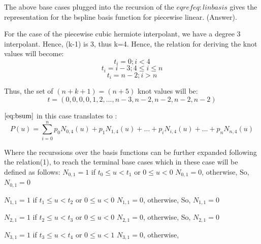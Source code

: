 \documentclass{article}
\begin{document}
The above base cases plugged into the recursion of the $eqref{eq:linbasis}$ gives the representation for the bspline basis function for piecewise linear. (Answer). \newline

For the case of the piecewise cubic hermiote interpolant, we have a degree 3 interpolant. Hence, (k-1) is 3, thus k=4. Hence, the relation for deriving the knot values will become: \newline
\[ t_i = 0; i < 4\]
\[ t_i = i-3; 4 \leq i \leq n \]
\[ t_i = n-2; i > n\]

Thus, the set of $(n+k+1) = (n+5)$ knot values will be: \newline
\[ t = (0,0,0,0,1,2, \dots, n-3, n-2,n-2,n-2,n-2)\]

$\eqref{eq:bsum}$ in this case translates to : \newline
\begin{equation}
 P(u) = \sum_{i=0}^n p_0 N_{0,4}(u) + p_1 N_{1,4}(u) + \dots + p_i N_{i,4}(u) + \dots + p_n N_{n,4}(u) 
 \label{eq:cubasis}
\end{equation}

Where the recurssions over the basis functions can be further expanded following the relation(1), to reach the terminal base cases which in these case will be defined as follows: \newline
$N_{0,1} = 1 $ if $t_0 \leq u < t_1$ or $0 \leq u < 0$ \newline
$N_{0,1} = 0$, otherwise, \newline
So, $N_{0,1} = 0$ \newline \newline

$N_{1,1} = 1 $ if $t_1 \leq u < t_2$ or $0 \leq u < 0$ \newline
$N_{1,1} = 0$, otherwise, \newline
So, $N_{1,1} = 0$ \newline \newline

$N_{2,1} = 1 $ if $t_2 \leq u < t_3$ or $0 \leq u < 0$ \newline
$N_{2,1} = 0$, otherwise, \newline
So, $N_{2,1} = 0$ \newline \newline

$N_{3,1} = 1$ if $t_3 \leq u < t_4$ or $0 \leq u < 1$ \newline
$N_{3,1} = 0$, otherwise, \newline \newline
\end{document}
